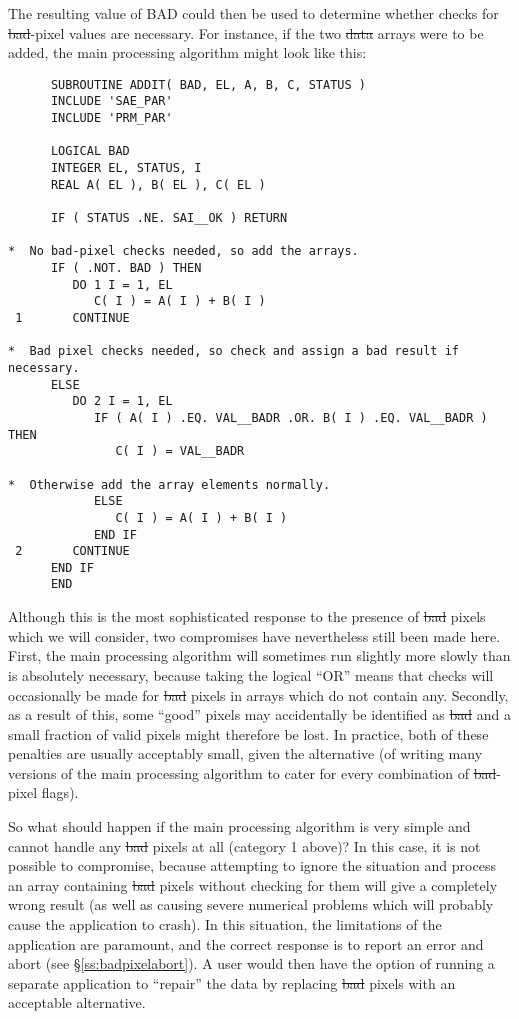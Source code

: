 The resulting value of BAD could then be used to determine whether checks
for \st{bad\/}-pixel values are necessary. 
For instance, if the two \st{data\/} arrays were to be added, the main
processing algorithm might look like this: 

\small
\begin{verbatim}
      SUBROUTINE ADDIT( BAD, EL, A, B, C, STATUS )
      INCLUDE 'SAE_PAR'
      INCLUDE 'PRM_PAR'

      LOGICAL BAD
      INTEGER EL, STATUS, I
      REAL A( EL ), B( EL ), C( EL )

      IF ( STATUS .NE. SAI__OK ) RETURN

*  No bad-pixel checks needed, so add the arrays.
      IF ( .NOT. BAD ) THEN
         DO 1 I = 1, EL
            C( I ) = A( I ) + B( I )
 1       CONTINUE

*  Bad pixel checks needed, so check and assign a bad result if necessary.
      ELSE
         DO 2 I = 1, EL
            IF ( A( I ) .EQ. VAL__BADR .OR. B( I ) .EQ. VAL__BADR ) THEN
               C( I ) = VAL__BADR

*  Otherwise add the array elements normally.
            ELSE
               C( I ) = A( I ) + B( I )
            END IF
 2       CONTINUE
      END IF
      END
\end{verbatim}
\normalsize

Although this is the most sophisticated response to the presence of
\st{bad\/} pixels which we will consider, two compromises have
nevertheless 
still been made here. 
First, the main processing algorithm will sometimes run slightly more slowly
than is absolutely necessary, because taking the logical ``OR'' means that
checks will occasionally be made for \st{bad\/} pixels in arrays which do not
contain any. 
Secondly, as a result of this, some ``good'' pixels may accidentally be
identified as \st{bad\/} and a small fraction of valid pixels might therefore
be lost. 
In practice, both of these penalties are usually acceptably small, given the
alternative (of writing many versions of the main processing algorithm to
cater for every combination of \st{bad\/}-pixel flags). 

So what should happen if the main processing algorithm is very simple and
cannot handle any \st{bad\/} pixels at all (category 1 above)? 
In this case, it is not possible to compromise, because attempting to ignore
the situation and process an array containing \st{bad\/} pixels without
checking for them will give a completely wrong result (as well as causing
severe numerical problems which will probably cause the application to
crash). 
In this situation, the limitations of the application are paramount, and the
correct response is to report an error and abort (see 
\S\ref{ss:badpixelabort}). 
A user would then have the option of running a separate application to
``repair'' the data by replacing \st{bad\/} pixels with an acceptable
alternative. 


